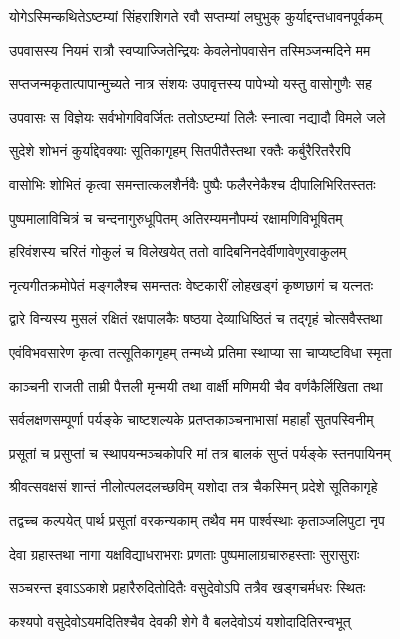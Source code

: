 \twolineshloka
{योगेऽस्मिन्कथितेऽष्टम्यां सिंहराशिगते रवौ}
{सप्तम्यां लघुभुक् कुर्याद्दन्तधावनपूर्वकम्}%

\twolineshloka
{उपवासस्य नियमं रात्रौ स्वप्याज्जितेन्द्रियः}
{केवलेनोपवासेन तस्मिञ्जन्मदिने मम}%

\twolineshloka
{सप्तजन्मकृतात्पापान्मुच्यते नात्र संशयः}
{उपावृत्तस्य पापेभ्यो यस्तु वासोगुणैः सह}%

\twolineshloka
{उपवासः स विज्ञेयः सर्वभोगविवर्जितः}
{ततोऽष्टम्यां तिलैः स्नात्वा नद्यादौ विमले जले}%

\twolineshloka
{सुदेशे शोभनं कुर्याद्देवक्याः सूतिकागृहम्}
{सितपीतैस्तथा रक्तैः कर्बुरैरितरैरपि}%

\twolineshloka
{वासोभिः शोभितं कृत्वा समन्तात्कलशैर्नवैः}
{पुष्पैः फलैरनेकैश्च दीपालिभिरितस्ततः}%

\twolineshloka
{पुष्पमालाविचित्रं च चन्दनागुरुधूपितम्}
{अतिरम्यमनौपम्यं रक्षामणिविभूषितम्}%

\twolineshloka
{हरिवंशस्य चरितं गोकुलं च विलेखयेत्}
{ततो वादिबनिनदेर्वीणावेणुरवाकुलम्}%

\twolineshloka
{नृत्यगीतक्रमोपेतं मङ्गलैश्च समन्ततः}
{वेष्टकारीं लोहखड्गं कृष्णछागं च यत्नतः}%

\twolineshloka
{द्वारे विन्यस्य मुसलं रक्षितं रक्षपालकैः}
{षष्ठया देव्याधिष्ठितं च तद्गृहं चोत्सवैस्तथा}%

\twolineshloka
{एवंविभवसारेण कृत्वा तत्सूतिकागृहम्}
{तन्मध्ये प्रतिमा स्थाप्या सा चाप्यष्टविधा स्मृता}%

\twolineshloka
{काञ्चनी राजती ताम्री पैत्तली मृन्मयी तथा}
{वार्क्षी मणिमयी चैव वर्णकैर्लिखिता तथा}%

\twolineshloka
{सर्वलक्षणसम्पूर्णा पर्यङ्के चाष्टशल्यके}
{प्रतप्तकाञ्चनाभासां महार्हां सुतपस्विनीम्}%

\twolineshloka
{प्रसूतां च प्रसुप्तां च स्थापयन्मञ्चकोपरि}
{मां तत्र बालकं सुप्तं पर्यङ्के स्तनपायिनम्}%

\twolineshloka
{श्रीवत्सवक्षसं शान्तं नीलोत्पलदलच्छविम्}
{यशोदा तत्र चैकस्मिन् प्रदेशे सूतिकागृहे}%

\twolineshloka
{तद्वच्च कल्पयेत् पार्थ प्रसूतां वरकन्यकाम्}
{तथैव मम पार्श्वस्थाः कृताञ्जलिपुटा नृप}%

\twolineshloka
{देवा ग्रहास्तथा नागा यक्षविद्याधराभराः}
{प्रणताः पुष्पमालाग्रचारुहस्ताः सुरासुराः}%

\twolineshloka
{सञ्चरन्त इवाऽऽकाशे प्रहारैरुदितोदितैः}
{वसुदेवोऽपि तत्रैव खड्गचर्मधरः स्थितः}%

\twolineshloka
{कश्यपो वसुदेवोऽयमदितिश्चैव देवकी}
{शेगे वै बलदेवोऽयं यशोदादितिरन्वभूत्}%


